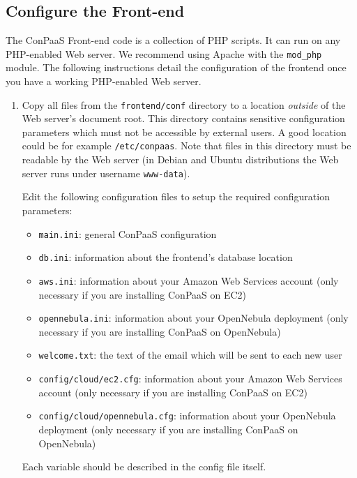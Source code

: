 \documentclass[10pt]{article}
\begin{document}
\subsection{Configure the Front-end}

The ConPaaS Front-end code is a collection of PHP scripts. It can run
on any PHP-enabled Web server. We recommend using Apache with the
\verb+mod_php+ module. The following instructions detail the
configuration of the frontend once you have a working PHP-enabled Web
server.

\begin{enumerate}
\item Copy all files from the \verb+frontend/conf+ directory to a
  location \emph{outside} of the Web server's document root.
  This directory contains sensitive configuration parameters which
  must not be accessible by external users. A good location could be
  for example \verb+/etc/conpaas+. Note that files in this
  directory must be readable by the Web server (in Debian and Ubuntu
  distributions the Web server runs under username \verb+www-data+).

  Edit the following configuration files to setup the required
  configuration parameters:
  \begin{itemize}
  \item \texttt{main.ini}: general ConPaaS configuration
  \item \texttt{db.ini}: information about the frontend's database location
  \item \texttt{aws.ini}: information about your Amazon Web Services
    account (only necessary if you are installing ConPaaS on EC2)
  \item \texttt{opennebula.ini}: information about your OpenNebula
    deployment (only necessary if you are installing ConPaaS on
    OpenNebula)
  \item \texttt{welcome.txt}: the text of the email which will be sent
    to each new user
  \item \texttt{config/cloud/ec2.cfg}: information about your Amazon
    Web Services account (only necessary if you are installing ConPaaS
    on EC2)
  \item \texttt{config/cloud/opennebula.cfg}: information about your
    OpenNebula deployment (only necessary if you are installing
    ConPaaS on OpenNebula)
  \end{itemize}

  Each variable should be described in the config file itself. 


\end{enumerate}
\end{document}
